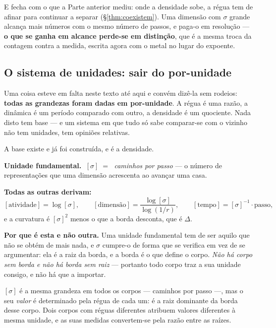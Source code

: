 \documentclass[livro.tex]{subfiles}
\begin{document}
\medskip
\noindent E fecha com o que a Parte anterior mediu: onde a densidade sobe, a régua tem de afinar
para continuar a separar (\S\ref{thm:coexistem}). Uma dimensão com $\sigma$ grande alcança mais
números com o mesmo número de passos, e paga-o em resolução --- \textbf{o que se ganha em alcance
perde-se em distinção}, que é a mesma troca da contagem contra a medida, escrita agora com o metal
no lugar do expoente.



\subsection{O sistema de unidades: sair do por-unidade}\label{sec:unidades}

\noindent Uma coisa esteve em falta neste texto até aqui e convém dizê-la sem rodeios:
\textbf{todas as grandezas foram dadas em por-unidade}. A régua é uma razão, a dinâmica é um
período comparado com outro, a densidade é um quociente. Nada disto tem base --- e um sistema em
que tudo só sabe comparar-se com o vizinho não tem unidades, tem opiniões relativas.

\medskip
\noindent A base existe e já foi construída, e é a densidade.

\begin{mdframed}[linewidth=0.4pt,innerleftmargin=10pt,innerrightmargin=10pt,
                 innertopmargin=8pt,innerbottommargin=8pt,skipabove=6pt,skipbelow=6pt]
\textbf{Unidade fundamental.} $\;[\sigma] \;=\;$ \emph{caminhos por passo} --- o número de
representações que uma dimensão acrescenta ao avançar uma casa.

\medskip
\textbf{Todas as outras derivam:}
\[
  [\text{atividade}] = \log[\sigma], \qquad
  [\text{dimensão}] = \frac{\log[\sigma]}{\log(1/r)}, \qquad
  [\text{tempo}] = [\sigma]^{-1}\!\cdot\text{passo},
\]
e a curvatura é $[\sigma]^{2}$ menos o que a borda desconta, que é $\Delta$.
\end{mdframed}

\noindent \textbf{Por que é esta e não outra.} Uma unidade fundamental tem de ser aquilo que não se
obtém de mais nada, e $\sigma$ cumpre-o de forma que se verifica em vez de se argumentar: ela é a
raiz da borda, e a borda é o que define o corpo. \emph{Não há corpo sem borda e não há borda sem
raiz} --- portanto todo corpo traz a sua unidade consigo, e não há que a importar.

\begin{teorema}\label{thm:unidadelocal}
$[\sigma]$ é a mesma grandeza em todos os corpos --- caminhos por passo ---, mas o seu
\emph{valor} é determinado pela régua de cada um: é a raiz dominante da borda desse corpo. Dois
corpos com réguas diferentes atribuem valores diferentes à mesma unidade, e as suas medidas
convertem-se pela razão entre as raízes.
\end{teorema}
\end{document}
